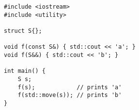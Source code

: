 \begin{lstlisting}[title=\href{https://godbolt.org/z/tK34H9}{\texttt{godbolt.org/z/tK34H9}}]
#include <iostream>
#include <utility>

struct S{};

void f(const S&) { std::cout << 'a'; }
void f(S&&) { std::cout << 'b'; }

int main() {
    S s;
    f(s);            // prints 'a'
    f(std::move(s)); // prints 'b'
}
\end{lstlisting}
